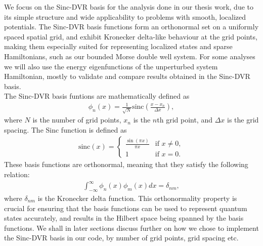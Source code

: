 \documentclass{subfiles}
\begin{document}
We focus on the Sinc-DVR basis \cite{colbert1992novel} for the analysis done in our thesis work, due to its simple structure and wide applicability to problems with smooth, localized potentials. The Sinc-DVR basis functions form an orthonormal set on a uniformly spaced spatial grid, and exhibit Kronecker delta-like behaviour at the grid points, making them especially suited for representing localized states and sparse Hamiltonians, such as our bounded Morse double well system. For some analyses we will also use the energy eigenfunctions of the unperturbed system Hamiltonian, mostly to validate and compare results obtained in the Sinc-DVR basis.
\\ The Sinc-DVR basis funtions are mathematically defined as
\begin{align}
    \phi_n(x) = \frac{1}{\sqrt{N}} \text{sinc}\left(\frac{x - x_n}{\Delta x}\right),\label{eq:sinc_dvr}
\end{align}
where $N$ is the number of grid points, $x_n$ is the $n$th grid point, and $\Delta x$ is the grid spacing. The Sinc function is defined as
\begin{align*}
    \text{sinc}(x) = \begin{cases}
        \frac{\sin(\pi x)}{\pi x} & \text{if } x \neq 0, \\
        1 & \text{if } x = 0.
    \end{cases}
\end{align*}
These basis functions are orthonormal, meaning that they satisfy the following relation:
\begin{align*}
    \int_{-\infty}^{\infty} \phi_n(x) \phi_m(x) dx = \delta_{nm},
\end{align*}
where $\delta_{nm}$ is the Kronecker delta function. This orthonormality property is crucial for ensuring that the basis functions can be used to represent quantum states accurately, and results in the Hilbert space being spanned by the basis functions. We shall in later sections discuss further on how we chose to implement the Sinc-DVR basis in our code, by number of grid points, grid spacing etc. 
\end{document}
